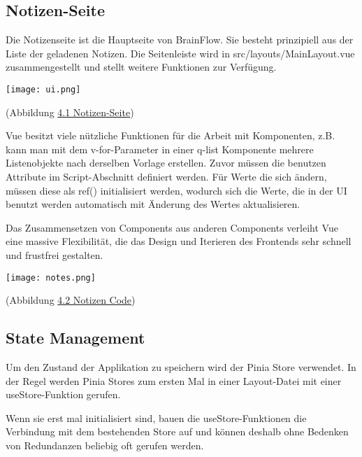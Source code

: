     \subsection{Notizen-Seite}
    Die Notizenseite ist die Hauptseite von BrainFlow. Sie besteht prinzipiell aus der Liste der geladenen Notizen. Die Seitenleiste wird in src/layouts/MainLayout.vue
    zusammengestellt und stellt weitere Funktionen zur Verfügung.

        \bigskip\noindent
        \begin{center}
        \texttt{[image: ui.png]}
        \end{center}
        \begin{center}
            (Abbildung \hyperref[ui]{4.1 Notizen-Seite})
        \end{center}

    \bigskip\noindent
    Vue besitzt viele nützliche Funktionen für die Arbeit mit Komponenten, z.B. kann man mit dem \flqq v-for\frqq-Parameter in einer q-list Komponente mehrere
    Listenobjekte nach derselben Vorlage erstellen. Zuvor müssen die benutzen Attribute im Script-Abschnitt definiert werden. Für Werte die sich ändern, müssen diese als
    ref() initialisiert werden, wodurch sich die Werte, die in der UI benutzt werden automatisch mit Änderung des Wertes aktualisieren.

    \bigskip\noindent
    Das Zusammensetzen von Components aus anderen Components verleiht Vue eine massive Flexibilität, die das Design und Iterieren des Frontends sehr schnell
    und frustfrei gestalten.

    \bigskip\noindent
    \begin{center}
    \texttt{[image: notes.png]}
    \end{center}
    \begin{center}
        (Abbildung \hyperref[notes]{4.2 Notizen Code})
    \end{center}

    \subsection{State Management}
        Um den Zustand der Applikation zu speichern wird der Pinia Store verwendet. In der Regel werden Pinia Stores zum ersten Mal in einer Layout-Datei
        mit einer useStore-Funktion gerufen.
        
        \bigskip\noindent
        Wenn sie erst mal initialisiert sind, bauen die useStore-Funktionen die Verbindung mit dem bestehenden Store auf und
        können deshalb ohne Bedenken von Redundanzen beliebig oft gerufen werden.

